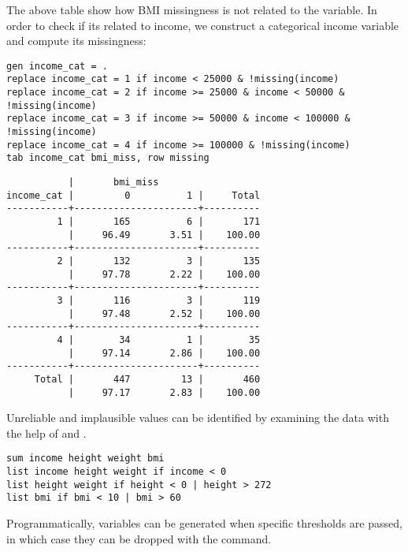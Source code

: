 The above table show how BMI missingness is not related to the  variable. In order to check if its related to income, we construct a categorical income variable and compute its missingness:

\begin{verbatim}
gen income_cat = .
replace income_cat = 1 if income < 25000 & !missing(income)
replace income_cat = 2 if income >= 25000 & income < 50000 & !missing(income)
replace income_cat = 3 if income >= 50000 & income < 100000 & !missing(income)
replace income_cat = 4 if income >= 100000 & !missing(income)
tab income_cat bmi_miss, row missing
\end{verbatim}

\newpage

\begin{verbatim}
           |       bmi_miss
income_cat |         0          1 |     Total
-----------+----------------------+----------
         1 |       165          6 |       171 
           |     96.49       3.51 |    100.00 
-----------+----------------------+----------
         2 |       132          3 |       135 
           |     97.78       2.22 |    100.00 
-----------+----------------------+----------
         3 |       116          3 |       119 
           |     97.48       2.52 |    100.00 
-----------+----------------------+----------
         4 |        34          1 |        35 
           |     97.14       2.86 |    100.00 
-----------+----------------------+----------
     Total |       447         13 |       460 
           |     97.17       2.83 |    100.00   
\end{verbatim}


Unreliable and implausible values can be identified by examining the data with the help of  and .

\begin{verbatim}
sum income height weight bmi
list income height weight if income < 0
list height weight if height < 0 | height > 272
list bmi if bmi < 10 | bmi > 60
\end{verbatim}

Programmatically,  variables can be generated when specific thresholds are passed, in which case they can be dropped with the  command.

